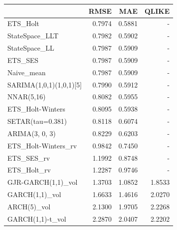 \begin{tabular}{lrrr}
\toprule
 & RMSE & MAE & QLIKE \\
\midrule
ETS_Holt & 0.7974 & 0.5881 & - \\
StateSpace_LLT & 0.7982 & 0.5902 & - \\
StateSpace_LL & 0.7987 & 0.5909 & - \\
ETS_SES & 0.7987 & 0.5909 & - \\
Naive_mean & 0.7987 & 0.5909 & - \\
SARIMA(1,0,1)(1,0,1)[5] & 0.7990 & 0.5912 & - \\
NNAR(5,16) & 0.8082 & 0.5955 & - \\
ETS_Holt-Winters & 0.8095 & 0.5938 & - \\
SETAR(tau=0.381) & 0.8118 & 0.6074 & - \\
ARIMA(3, 0, 3) & 0.8229 & 0.6203 & - \\
ETS_Holt-Winters_rv & 0.9842 & 0.7450 & - \\
ETS_SES_rv & 1.1992 & 0.8748 & - \\
ETS_Holt_rv & 1.2287 & 0.9746 & - \\
GJR-GARCH(1,1)_vol & 1.3703 & 1.0852 & 1.8533 \\
GARCH(1,1)_vol & 1.6633 & 1.4616 & 2.0270 \\
ARCH(5)_vol & 2.1300 & 1.9705 & 2.2268 \\
GARCH(1,1)-t_vol & 2.2870 & 2.0407 & 2.2202 \\
\bottomrule
\end{tabular}
